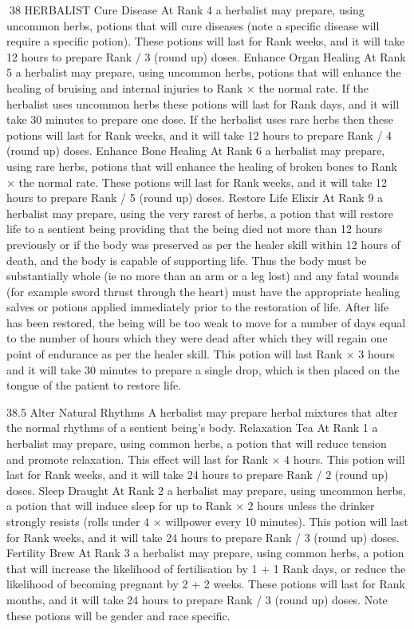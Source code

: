 \documentclass[a4paper]{article}
\begin{document}
\begin{multicols}{3}
38 HERBALIST
Cure Disease
At Rank 4 a herbalist may prepare, using uncommon herbs, potions that will cure diseases (note a
specific disease will require a specific potion).
These potions will last for Rank weeks, and it will
take 12 hours to prepare Rank / 3 (round up) doses.
Enhance Organ Healing
At Rank 5 a herbalist may prepare, using uncommon herbs, potions that will enhance the healing of
bruising and internal injuries to Rank × the normal
rate. If the herbalist uses uncommon herbs these
potions will last for Rank days, and it will take 30
minutes to prepare one dose. If the herbalist uses
rare herbs then these potions will last for Rank
weeks, and it will take 12 hours to prepare Rank / 4
(round up) doses.
Enhance Bone Healing
At Rank 6 a herbalist may prepare, using rare
herbs, potions that will enhance the healing of
broken bones to Rank × the normal rate. These
potions will last for Rank weeks, and it will take 12
hours to prepare Rank / 5 (round up) doses.
Restore Life Elixir
At Rank 9 a herbalist may prepare, using the very
rarest of herbs, a potion that will restore life to a
sentient being providing that the being died not
more than 12 hours previously or if the body was
preserved as per the healer skill within 12 hours of
death, and the body is capable of supporting life.
Thus the body must be substantially whole (ie no
more than an arm or a leg lost) and any fatal
wounds (for example sword thrust through the
heart) must have the appropriate healing salves or
potions applied immediately prior to the restoration
of life. After life has been restored, the being will
be too weak to move for a number of days equal to
the number of hours which they were dead after
which they will regain one point of endurance as
per the healer skill. This potion will last Rank × 3
hours and it will take 30 minutes to prepare a single drop, which is then placed on the tongue of the
patient to restore life.

38.5 Alter Natural Rhythms
A herbalist may prepare herbal mixtures that alter
the normal rhythms of a sentient being’s body.
Relaxation Tea
At Rank 1 a herbalist may prepare, using common
herbs, a potion that will reduce tension and promote relaxation. This effect will last for Rank × 4
hours. This potion will last for Rank weeks, and it
will take 24 hours to prepare Rank / 2 (round up)
doses.
Sleep Draught
At Rank 2 a herbalist may prepare, using uncommon herbs, a potion that will induce sleep for up to
Rank × 2 hours unless the drinker strongly resists
(rolls under 4 × willpower every
10 minutes). This potion will last for Rank weeks,
and it will take 24 hours to prepare Rank / 3 (round
up) doses.
Fertility Brew
At Rank 3 a herbalist may prepare, using common
herbs, a potion that will increase the likelihood of
fertilisation by 1 + 1%
Rank days, or reduce the likelihood of becoming
pregnant by 2 + 2%
weeks. These potions will last for Rank months,
and it will take 24 hours to prepare Rank / 3 (round
up) doses. Note these potions will be gender and
race specific.


\end{multicols}
\end{document}
